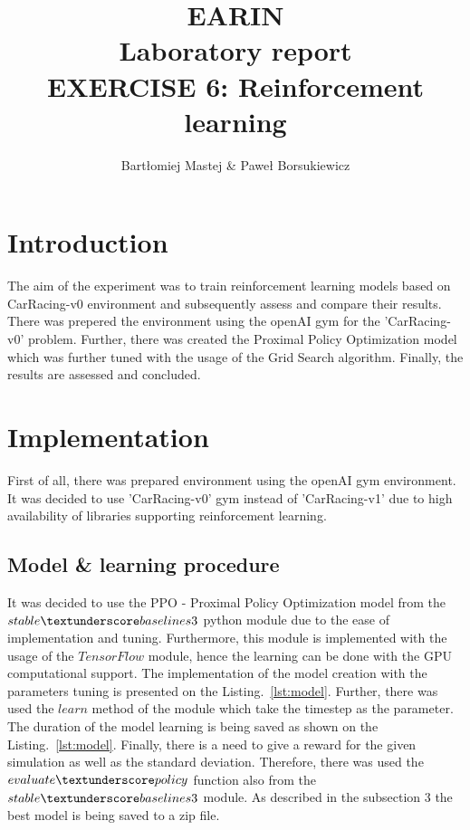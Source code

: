 \documentclass[runningheads]{llncs}
\begin{document}
%
\title{EARIN\\Laboratory report\\EXERCISE 6: Reinforcement learning}
%
\author{Bartłomiej Mastej \& Paweł Borsukiewicz}
%

%
\maketitle              %
%
%
%
%
\section{Introduction}
The aim of the experiment was to train reinforcement learning models based on CarRacing-v0 environment and subsequently assess and compare their results. There was prepered the environment using the openAI gym for the 'CarRacing-v0' problem. Further, there was created the Proximal Policy Optimization model which was further tuned with the usage of the Grid Search algorithm. Finally, the results are assessed and concluded.

\section{Implementation}
First of all, there was prepared environment using the openAI gym environment. It was decided to use 'CarRacing-v0' gym instead of 'CarRacing-v1' due to high availability of libraries supporting reinforcement learning.
\subsection{Model \& learning procedure}
It was decided to use the PPO - Proximal Policy Optimization model from the $stable\textunderscore baselines3$ python module due to the ease of implementation and tuning. Furthermore, this module is implemented with the usage of the $TensorFlow$ module, hence the learning can be done with the GPU computational support. The implementation of the model creation with the parameters tuning is presented on the Listing.~\ref{lst:model}. Further, there was used the $learn$ method of the module which take the timestep as the parameter. The duration of the model learning is being saved as shown on the Listing.~\ref{lst:model}. Finally, there is a need to give a reward for the given simulation as well as the standard deviation. Therefore, there was used the $evaluate\textunderscore policy$ function also from the $stable\textunderscore baselines3$ module. As described in the subsection 3 the best model is being saved to a zip file.
\end{document}
